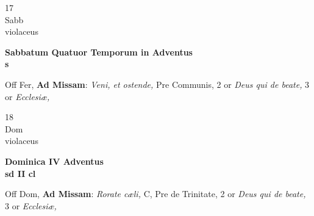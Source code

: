\documentclass[10pt, openany]{book}
\begin{document}
        \begin{center}
            \begin{minipage}{3.5in}
                \vspace{2em}
                \begin{minipage}{0.5in}
                    {\Huge 17} \\
                    {\normalsize Sabb} \\
                    {\normalsize violaceus}
                \end{minipage}
                \begin{minipage}{3.0in}
                    \textbf{ \large Sabbatum Quatuor Temporum in Adventus \\
                    \textnormal{\normalsize s}} \\ 
                \end{minipage}
                \begin{justify}Off Fer, \textbf{Ad Missam}: \textit{Veni, et ostende,} Pre Communis, 2 or \textit{Deus qui de beate,} 3 or \textit{Ecclesiæ,}  
                \end{justify}
            \end{minipage}
        \end{center}
    
        \begin{center}
            \begin{minipage}{3.5in}
                \vspace{2em}
                \begin{minipage}{0.5in}
                    {\Huge 18} \\
                    {\normalsize Dom} \\
                    {\normalsize violaceus}
                \end{minipage}
                \begin{minipage}{3.0in}
                    \textbf{ \large Dominica IV Adventus \\
                    \textnormal{\normalsize sd II cl}} \\ 
                \end{minipage}
                \begin{justify}Off Dom, \textbf{Ad Missam}: \textit{Rorate cæli,} C, Pre de Trinitate, 2 or \textit{Deus qui de beate,} 3 or \textit{Ecclesiæ,}  
                \end{justify}
            \end{minipage}
        \end{center}
    
\end{document}
